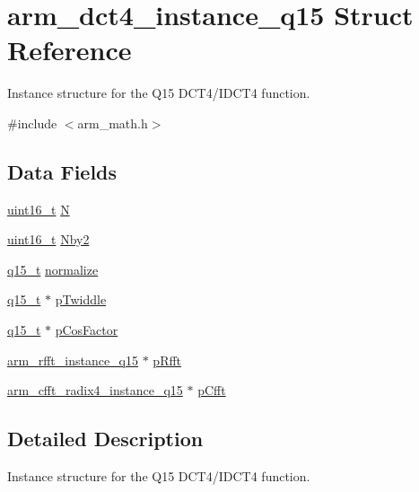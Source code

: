 \hypertarget{structarm__dct4__instance__q15}{\section{arm\-\_\-dct4\-\_\-instance\-\_\-q15 Struct Reference}
\label{structarm__dct4__instance__q15}
}


Instance structure for the Q15 D\-C\-T4/\-I\-D\-C\-T4 function.  




{\ttfamily \#include $<$arm\-\_\-math.\-h$>$}

\subsection*{Data Fields}
\begin{DoxyCompactItemize}
\item 
\hyperlink{stdint_8h_a273cf69d639a59973b6019625df33e30}{uint16\-\_\-t} \hyperlink{structarm__dct4__instance__q15_a53d24009bb9b2e93d0aa07db7f1a6c25}{N}
\item 
\hyperlink{stdint_8h_a273cf69d639a59973b6019625df33e30}{uint16\-\_\-t} \hyperlink{structarm__dct4__instance__q15_af43dcbbc2fc661ffbc525afe3dcbd7da}{Nby2}
\item 
\hyperlink{arm__math_8h_ab5a8fb21a5b3b983d5f54f31614052ea}{q15\-\_\-t} \hyperlink{structarm__dct4__instance__q15_a197098140d68e89a08f7a249003a0b86}{normalize}
\item 
\hyperlink{arm__math_8h_ab5a8fb21a5b3b983d5f54f31614052ea}{q15\-\_\-t} $\ast$ \hyperlink{structarm__dct4__instance__q15_abc6c847e9f906781e1d5da40e9aafa76}{p\-Twiddle}
\item 
\hyperlink{arm__math_8h_ab5a8fb21a5b3b983d5f54f31614052ea}{q15\-\_\-t} $\ast$ \hyperlink{structarm__dct4__instance__q15_ac76df681b1bd502fb4874c06f055dded}{p\-Cos\-Factor}
\item 
\hyperlink{structarm__rfft__instance__q15}{arm\-\_\-rfft\-\_\-instance\-\_\-q15} $\ast$ \hyperlink{structarm__dct4__instance__q15_a11cf95c1cd9dd2dd5e4b81b8f88dc208}{p\-Rfft}
\item 
\hyperlink{structarm__cfft__radix4__instance__q15}{arm\-\_\-cfft\-\_\-radix4\-\_\-instance\-\_\-q15} $\ast$ \hyperlink{structarm__dct4__instance__q15_a7284932ee8c36107c33815eb62eadffc}{p\-Cfft}
\end{DoxyCompactItemize}


\subsection{Detailed Description}
Instance structure for the Q15 D\-C\-T4/\-I\-D\-C\-T4 function. 

